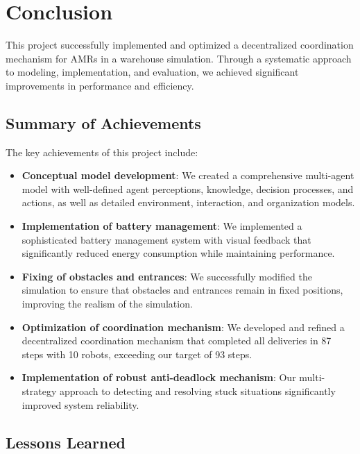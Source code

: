 \documentclass[12pt,a4paper]{article}
\begin{document}
\section{Conclusion}

This project successfully implemented and optimized a decentralized coordination mechanism for AMRs in a warehouse simulation. Through a systematic approach to modeling, implementation, and evaluation, we achieved significant improvements in performance and efficiency.

\subsection{Summary of Achievements}

The key achievements of this project include:

\begin{itemize}
    \item \textbf{Conceptual model development}: We created a comprehensive multi-agent model with well-defined agent perceptions, knowledge, decision processes, and actions, as well as detailed environment, interaction, and organization models.

    \item \textbf{Implementation of battery management}: We implemented a sophisticated battery management system with visual feedback that significantly reduced energy consumption while maintaining performance.

    \item \textbf{Fixing of obstacles and entrances}: We successfully modified the simulation to ensure that obstacles and entrances remain in fixed positions, improving the realism of the simulation.

    \item \textbf{Optimization of coordination mechanism}: We developed and refined a decentralized coordination mechanism that completed all deliveries in 87 steps with 10 robots, exceeding our target of 93 steps.

    \item \textbf{Implementation of robust anti-deadlock mechanism}: Our multi-strategy approach to detecting and resolving stuck situations significantly improved system reliability.
\end{itemize}

\subsection{Lessons Learned}
\end{document}
